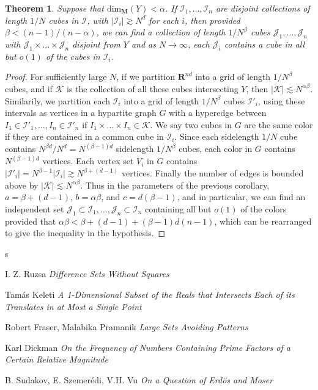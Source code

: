\documentclass{article}
\theoremstyle{plain}
\theoremstyle{plain}
\newtheorem{theorem}{Theorem}
\begin{document}
\begin{multicols}{2}
\begin{theorem}
	Suppose that $\text{dim}_{\mathbf{M}}(Y) < \alpha$. If $\mathcal{I}_1, \dots, \mathcal{I}_n$ are disjoint collections of length $1/N$ cubes in $\mathcal{I}$, with $|\mathcal{I}_i| \gtrsim N^d$ for each $i$, then provided $\beta < (n-1)/(n-\alpha)$, we can find a collection of length $1/N^\beta$ cubes $\mathcal{J}_1, \dots, \mathcal{J}_n$ with $\mathcal{J}_1 \times \dots \times \mathcal{J}_n$ disjoint from $Y$ and as $N \to \infty$, each $\mathcal{J}_i$ contains a cube in all but $o(1)$ of the cubes in $\mathcal{I}_i$.
\end{theorem}
\begin{proof}
	For sufficiently large $N$, if we partition $\mathbf{R}^{nd}$ into a grid of length $1/N^\beta$ cubes, and if $\mathcal{K}$ is the collection of all these cubes intersecting $Y$, then $|\mathcal{K}| \lesssim N^{\alpha \beta}$. Similarily, we partition each $\mathcal{I}_i$ into a grid of length $1/N^\beta$ cubes $\mathcal{I}'_i$, using these intervals as vertices in a hypartite graph $G$ with a hyperedge between $I_1 \in \mathcal{I}'_1, \dots, I_n \in \mathcal{I}'_n$ if $I_1 \times \dots \times I_n \in \mathcal{K}$. We say two cubes in $G$ are the same color if they are contained in a common cube in $\mathcal{I}_i$. Since each sidelength $1/N$ cube contains $N^{\beta d}/N^d = N^{(\beta - 1)d}$ sidelength $1/N^\beta$ cubes, each color in $G$ contains $N^{(\beta - 1)d}$ vertices. Each vertex set $V_i$ in $G$ contains $|\mathcal{I}'_i| = N^{\beta - 1} |\mathcal{I}_i| \gtrsim N^{\beta + (d-1)}$ vertices. Finally the number of edges is bounded above by $|\mathcal{K}| \lesssim N^{\alpha \beta}$. Thus in the parameters of the previous corollary, $a = \beta + (d-1)$, $b = \alpha \beta$, and $c = d(\beta - 1)$, and in particular, we can find an independent set $\mathcal{J}_1 \subset \mathcal{I}_1, \dots, \mathcal{J}_n \subset \mathcal{I}_n$ containing all but $o(1)$ of the colors provided that $\alpha \beta < \beta + (d-1) + (\beta - 1)d(n-1)$, which can be rearranged to give the inequality in the hypothesis.
\end{proof}

s

\end{multicols}

\begin{thebibliography}{9}

I. Z. Ruzsa
\textit{Difference Sets Without Squares}

Tam\'{a}s Keleti
\textit{A 1-Dimensional Subset of the Reals that Intersects Each of its Translates in at Most a Single Point}

Robert Fraser, Malabika Pramanik
\textit{Large Sets Avoiding Patterns}

Karl Dickman
\textit{On the Frequency of Numbers Containing Prime Factors of a Certain Relative Magnitude}

B. Sudakov, E. Szemer\'{e}di, V.H. Vu
\textit{On a Question of Erd\"{o}s and Moser}

\end{thebibliography}


\end{document}
